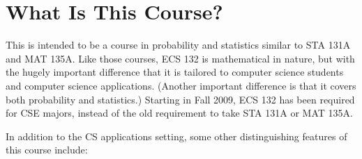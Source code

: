 \section{What Is This Course?}

This is intended to be a course in probability and statistics similar to
STA 131A and MAT 135A.  Like those courses, ECS 132 is mathematical in
nature,  but with the hugely important difference that it is tailored to
computer science students and computer science applications.  (Another
important difference is that it covers both probability and statistics.)
Starting in Fall 2009, ECS 132 has been required for CSE majors, instead
of the old requirement to take STA 131A or MAT 135A.  

In addition to the CS applications setting, some other distinguishing
features of this course include:

